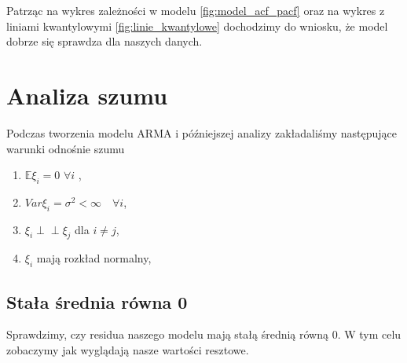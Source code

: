\documentclass[12pt]{article}
\begin{document}
Patrząc na wykres zależności w modelu \ref{fig:model_acf_pacf} oraz na wykres z liniami kwantylowymi \ref{fig:linie_kwantylowe} dochodzimy do wniosku, że model dobrze się sprawdza dla naszych danych.


	\section{Analiza szumu}
	Podczas tworzenia modelu ARMA i późniejszej analizy zakładaliśmy następujące warunki odnośnie szumu
	\begin{enumerate}
		\item $\mathbb{E}\xi_i=0$ $\forall i$ ,
		\item $Var\xi_i=\sigma^2<\infty\quad\forall i$,
		\item $\xi_i\perp\!\!\!\perp\xi_j$ dla $i\neq j$,
		\item $\xi_i$ mają rozkład normalny,
	\end{enumerate}
	
	\subsection{Stała średnia równa 0}
	Sprawdzimy, czy residua naszego modelu mają stałą średnią równą $0$. W tym celu zobaczymy jak wyglądają nasze wartości resztowe.
	
\end{document}
